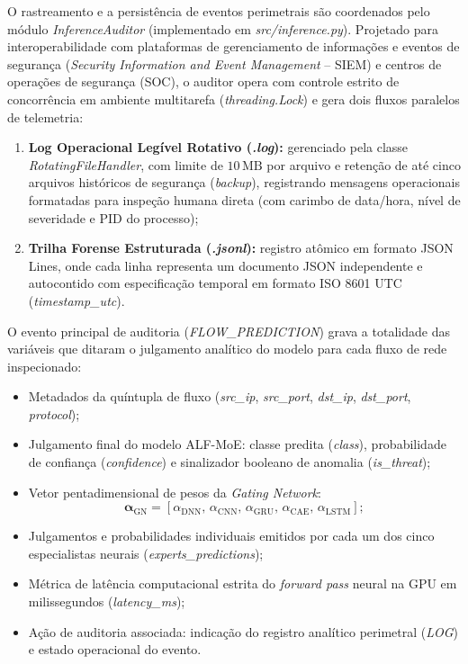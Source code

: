 O rastreamento e a persistência de eventos perimetrais são coordenados pelo módulo \emph{InferenceAuditor}
(implementado em \emph{src/inference.py}). Projetado para interoperabilidade com plataformas de gerenciamento de
informações e eventos de segurança (\emph{Security Information and Event Management} -- SIEM) e centros de operações de
segurança (SOC), o auditor opera com controle estrito de concorrência em ambiente multitarefa (\emph{threading.Lock}) e
gera dois fluxos paralelos de telemetria:
\begin{enumerate}
    \item \textbf{Log Operacional Legível Rotativo (\emph{.log}):} gerenciado pela classe \emph{RotatingFileHandler},
    com limite de $10\,\mathrm{MB}$ por arquivo e retenção de até cinco arquivos históricos de segurança
    (\emph{backup}), registrando mensagens operacionais formatadas para inspeção humana direta (com carimbo de
    data/hora, nível de severidade e PID do processo);
    \item \textbf{Trilha Forense Estruturada (\emph{.jsonl}):} registro atômico em formato JSON Lines, onde cada linha
    representa um documento JSON independente e autocontido com especificação temporal em formato ISO 8601 UTC
    (\emph{timestamp\_utc}).
\end{enumerate}

O evento principal de auditoria (\emph{FLOW\_PREDICTION}) grava a totalidade das variáveis que ditaram o julgamento
analítico do modelo para cada fluxo de rede inspecionado:
\begin{itemize}
    \item Metadados da quíntupla de fluxo (\emph{src\_ip}, \emph{src\_port}, \emph{dst\_ip}, \emph{dst\_port},
    \emph{protocol});
    \item Julgamento final do modelo ALF-MoE: classe predita (\emph{class}), probabilidade de confiança
    (\emph{confidence}) e sinalizador booleano de anomalia (\emph{is\_threat});
    \item Vetor pentadimensional de pesos da \emph{Gating Network}:
    \begin{equation}
    \boldsymbol{\alpha}_{\mathrm{GN}} = [\alpha_{\mathrm{DNN}}, \, \alpha_{\mathrm{CNN}}, \, \alpha_{\mathrm{GRU}},
    \, \alpha_{\mathrm{CAE}}, \, \alpha_{\mathrm{LSTM}}];
    \end{equation}
    \item Julgamentos e probabilidades individuais emitidos por cada um dos cinco especialistas neurais
    (\emph{experts\_predictions});
    \item Métrica de latência computacional estrita do \emph{forward pass} neural na GPU em milissegundos
    (\emph{latency\_ms});
    \item Ação de auditoria associada: indicação do registro analítico perimetral (\emph{LOG}) e estado operacional do
    evento.
\end{itemize}

